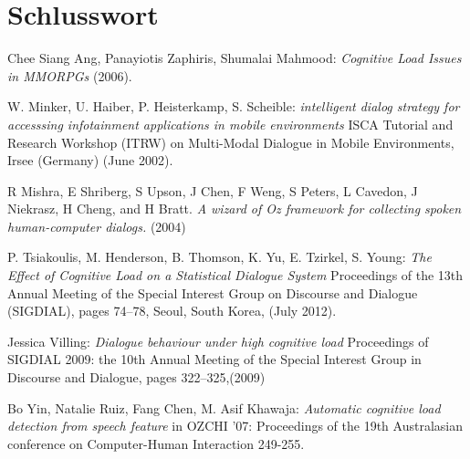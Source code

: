\documentclass[12pt,a4paper]{scrartcl}
\begin{document}
\section{Schlusswort}




\newpage
\appendix
{}


%
%

\begin{thebibliography}{Maron \& Ames, 1982}

	 Chee Siang Ang, Panayiotis Zaphiris, Shumalai Mahmood: \textit{Cognitive Load Issues in MMORPGs} 
(2006).

	 W. Minker, U. Haiber, P. Heisterkamp, S. 
Scheible: \textit{intelligent dialog strategy for accesssing infotainment applications in mobile 
environments} ISCA Tutorial and Research Workshop (ITRW) on Multi-Modal Dialogue in Mobile 
Environments, Irsee (Germany) (June 2002).

 R Mishra, E Shriberg, S Upson, J Chen, F Weng, S Peters,
L Cavedon, J Niekrasz, H Cheng, and H Bratt. \textit{A wizard of Oz framework for collecting spoken human-computer dialogs.} (2004)

	 P. Tsiakoulis, M. Henderson, B. Thomson, K. Yu, E. Tzirkel, S. Young: \textit{The Effect of Cognitive Load on a Statistical Dialogue System} Proceedings of the 13th Annual Meeting of the Special Interest Group on Discourse and Dialogue (SIGDIAL), pages 74–78,
Seoul, South Korea, (July 2012).

 Jessica Villing: \textit{Dialogue behaviour under high cognitive load} Proceedings of SIGDIAL 2009: the 10th Annual Meeting of the Special Interest Group in Discourse and Dialogue, pages 322–325,(2009)



 Bo Yin, Natalie Ruiz, Fang Chen, M. Asif Khawaja: \textit{Automatic cognitive load detection from speech feature} in OZCHI ’07: Proceedings of the 19th Australasian conference on Computer-Human Interaction 249-255. 



\end{thebibliography}
\end{document}
